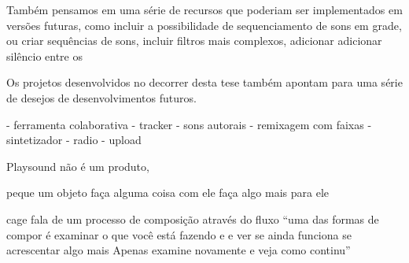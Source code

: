 Também pensamos em uma série de recursos que poderiam ser implementados em versões futuras, como incluir a possibilidade de sequenciamento de sons em grade, ou criar sequências de sons, incluir filtros mais complexos, adicionar adicionar silêncio entre os 




Os projetos desenvolvidos no decorrer desta tese também apontam para uma série de desejos de desenvolvimentos futuros. 

- ferramenta colaborativa
- tracker
- sons autorais
- remixagem com faixas 
- sintetizador
- radio
- upload

Playsound não é um produto,

peque um objeto
faça alguma coisa com ele
faça algo mais para ele

\cite[71]{Cage2015} 



cage fala de um processo de composição através do fluxo ``uma das formas de compor é examinar o que você está fazendo e e ver se ainda funciona se acrescentar algo mais Apenas examine novamente e veja como continu''

